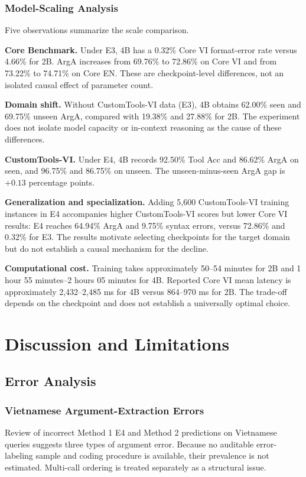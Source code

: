 \documentclass[10pt,twocolumn,a4paper]{article}
\begin{document}
\subsubsection{Model-Scaling Analysis}
Five observations summarize the scale comparison.

\textbf{Core Benchmark.} Under E3, 4B has a 0.32\% Core VI format-error rate versus 4.66\% for 2B. ArgA increases from 69.76\% to 72.86\% on Core VI and from 73.22\% to 74.71\% on Core EN. These are checkpoint-level differences, not an isolated causal effect of parameter count.

\textbf{Domain shift.} Without CustomTools-VI data (E3), 4B obtains 62.00\% seen and 69.75\% unseen ArgA, compared with 19.38\% and 27.88\% for 2B. The experiment does not isolate model capacity or in-context reasoning as the cause of these differences.

\textbf{CustomTools-VI.} Under E4, 4B records 92.50\% Tool Acc and 86.62\% ArgA on seen, and 96.75\% and 86.75\% on unseen. The unseen-minus-seen ArgA gap is $+0.13$ percentage points.

\textbf{Generalization and specialization.} Adding 5,600 CustomTools-VI training instances in E4 accompanies higher CustomTools-VI scores but lower Core VI results: E4 reaches 64.94\% ArgA and 9.75\% syntax errors, versus 72.86\% and 0.32\% for E3. The results motivate selecting checkpoints for the target domain but do not establish a causal mechanism for the decline.

\textbf{Computational cost.} Training takes approximately 50--54 minutes for 2B and 1 hour 55 minutes--2 hours 05 minutes for 4B. Reported Core VI mean latency is approximately 2,432--2,485 ms for 4B versus 864--970 ms for 2B. The trade-off depends on the checkpoint and does not establish a universally optimal choice.

\section{Discussion and Limitations}

\subsection{Error Analysis}
\subsubsection{Vietnamese Argument-Extraction Errors}
Review of incorrect Method 1 E4 and Method 2 predictions on Vietnamese queries suggests three types of argument error. Because no auditable error-labeling sample and coding procedure is available, their prevalence is not estimated. Multi-call ordering is treated separately as a structural issue.
\end{document}

